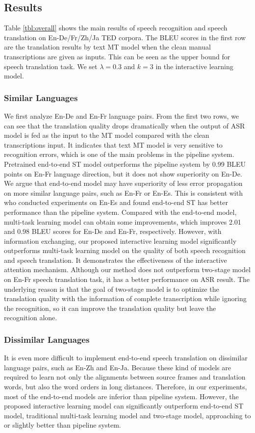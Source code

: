 \documentclass[letterpaper]{article} %
\begin{document}
\subsection{Results}
Table \ref{tbl:overall} shows the main results of speech recognition and speech translation on En-De/Fr/Zh/Ja TED corpora. The BLEU scores in the first row are the translation results by text MT model when the clean manual transcriptions are given as inputs. This can be seen as the upper bound for speech translation task.
We set $\lambda=0.3$ and $k=3$ in the interactive learning model.

\subsubsection{Similar Languages}
We first analyze En-De and En-Fr language pairs. From the first two rows, we can see that the translation quality drops dramatically when the output of ASR model is fed as the input to the MT model compared with the clean transcriptions input. It indicates that text MT model is very sensitive to recognition errors, which is one of the main problems in the pipeline system.
Pretrained end-to-end  ST model outperforms the pipeline system by 0.99 BLEU points on En-Fr language direction, but it does not show superiority on En-De.
We argue that end-to-end model may have superiority of less error propagation on more similar language pairs, such as En-Fr or En-Es. This is consistent with \citeauthor{weiss2017sequence}~ who conducted experiments on En-Es and found end-to-end ST has better performance than the pipeline system.
Compared with the end-to-end model, multi-task learning model can obtain some improvements, which improves 2.01 and 0.98 BLEU scores for En-De and En-Fr, respectively.
However, with information exchanging, our proposed interactive learning model significantly outperforms multi-task learning model on the quality of both speech recognition and speech translation.
It demonstrates the effectiveness of the interactive attention mechanism.
Although our method does not outperform two-stage model on En-Fr speech translation task, it has a better performance on ASR result. The underlying reason is that the goal of two-stage model is to optimize the translation quality with the information of complete transcription while ignoring the recognition, so it can improve the translation quality but leave the recognition alone.

\subsubsection{Dissimilar Languages}
It is even more difficult to implement end-to-end speech translation on dissimilar language pairs, such as En-Zh and En-Ja. Because these kind of models are required to learn not only the alignments between source frames and translation words, but also the word orders in long distances. Therefore, in our experiments, most of the end-to-end models are inferior than pipeline system. However, the proposed interactive learning model can significantly outperform end-to-end ST model, traditional multi-task learning model and two-stage model, approaching to or slightly better than  pipeline system.
\end{document}
